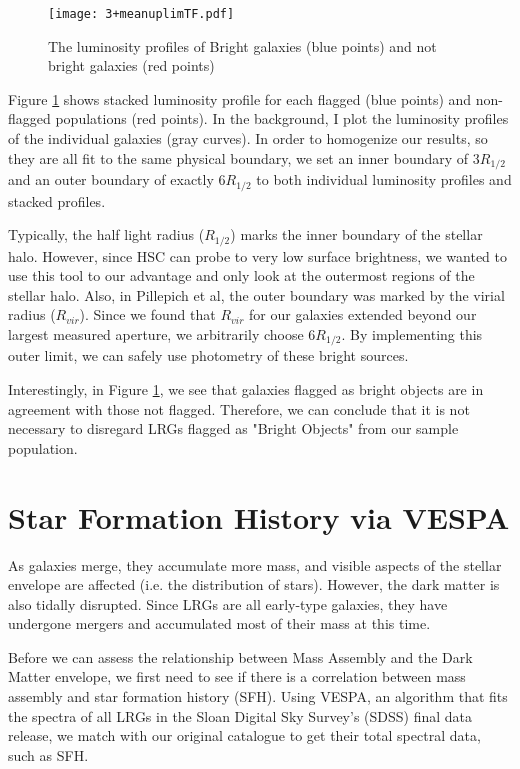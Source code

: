 \documentclass{article}
\begin{document}
\begin{figure}[h!]
\centering
\texttt{[image: 3+meanuplimTF.pdf]}
\caption{The luminosity profiles of Bright galaxies (blue points) and not bright galaxies (red points)}
\label{fig:mesh1}
\end{figure}


Figure \ref{fig:mesh1} shows stacked luminosity profile for each flagged (blue points) and non-flagged populations (red points). In the background, I plot the luminosity profiles of the individual galaxies (gray curves).  In order to homogenize our results, so they are all fit to the same physical boundary, we set an inner boundary of $3R_{1/2}$ and an outer boundary of exactly $6R_{1/2}$ to both individual luminosity profiles and stacked profiles. 

Typically, the half light radius ($R_{1/2}$) marks the inner boundary of the stellar halo. However, since HSC can probe to very low surface brightness, we wanted to use this tool to our advantage and only look at the outermost regions of the stellar halo. Also, in Pillepich et al, the outer boundary was marked by the virial radius ($R_{vir}$). Since we found that $R_{vir}$ for our galaxies extended beyond our largest measured aperture, we arbitrarily choose $6R_{1/2}$.  By implementing this outer limit, we can safely use photometry of these bright sources.

Interestingly,  in Figure \ref{fig:mesh1}, we see that galaxies flagged as bright objects are in agreement with those not flagged. Therefore, we can conclude that it is not necessary to disregard LRGs flagged as "Bright Objects" from our sample population. 

\section{Star Formation History via VESPA}
As galaxies merge, they accumulate more mass, and visible aspects of the stellar envelope are affected (i.e. the distribution of stars). However, the dark matter is also tidally disrupted. Since LRGs are all early-type galaxies, they have undergone mergers and accumulated most of their mass at this time.

Before we can assess the relationship between Mass Assembly and the Dark Matter envelope, we first need to see if there is a correlation between mass assembly and star formation history (SFH). Using VESPA, an algorithm that fits the spectra of all LRGs in the Sloan Digital Sky Survey's (SDSS) final data release, we match with our original catalogue to get their total spectral data, such as SFH.
\end{document}
